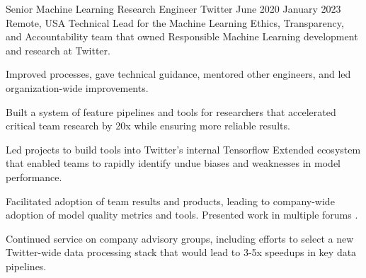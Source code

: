 \documentclass[print]{ag-cv} %
\begin{document}
\begin{job}
  {Senior Machine Learning Research Engineer}
  {Twitter}
  {June 2020}
  {January 2023}
  {Remote, USA}
  {
    Technical Lead for the Machine Learning Ethics, Transparency, and Accountability team that owned
    Responsible Machine Learning development and research at Twitter.
  }
  {
    \begin{myitemize}
      \item Improved processes, gave technical guidance, mentored other engineers, and led organization-wide improvements.

      \item Built a system of feature pipelines and tools for researchers that accelerated critical team research by 20x while ensuring more reliable results.

      \item Led projects to build tools into Twitter's internal Tensorflow Extended ecosystem that enabled teams to rapidly identify undue biases and weaknesses in model performance.

      \item Facilitated adoption of team results and products, leading to company-wide adoption of model quality metrics and tools. Presented work in multiple forums \autocite{twitter_htl_racial_bias,twitter_recsys_distributional_inequality,facct_2022_talk,datascience_2022_talk,privacy_enchancing_tech_post}.

      \item Continued service on company advisory groups, including efforts to select a new Twitter-wide data processing stack that would lead to 3-5x speedups in key data pipelines.
    \end{myitemize}
  }
\end{job}
\end{document}
